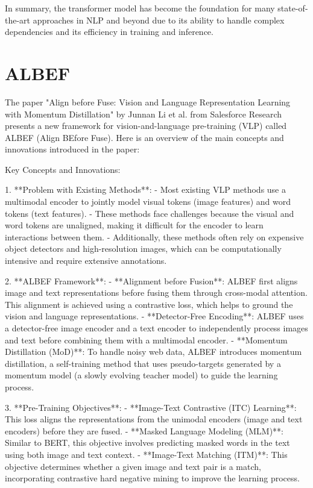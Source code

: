 In summary, the transformer model has become the foundation for many state-of-the-art approaches in NLP and beyond due to its ability to handle complex dependencies and its efficiency in training and inference.

\section{ALBEF}
The paper "Align before Fuse: Vision and Language Representation Learning with Momentum Distillation" by Junnan Li et al. from Salesforce Research presents a new framework for vision-and-language pre-training (VLP) called ALBEF (Align BEfore Fuse). Here is an overview of the main concepts and innovations introduced in the paper:

 Key Concepts and Innovations:

1. **Problem with Existing Methods**:
   - Most existing VLP methods use a multimodal encoder to jointly model visual tokens (image features) and word tokens (text features).
   - These methods face challenges because the visual and word tokens are unaligned, making it difficult for the encoder to learn interactions between them.
   - Additionally, these methods often rely on expensive object detectors and high-resolution images, which can be computationally intensive and require extensive annotations.

2. **ALBEF Framework**:
   - **Alignment before Fusion**: ALBEF first aligns image and text representations before fusing them through cross-modal attention. This alignment is achieved using a contrastive loss, which helps to ground the vision and language representations.
   - **Detector-Free Encoding**: ALBEF uses a detector-free image encoder and a text encoder to independently process images and text before combining them with a multimodal encoder.
   - **Momentum Distillation (MoD)**: To handle noisy web data, ALBEF introduces momentum distillation, a self-training method that uses pseudo-targets generated by a momentum model (a slowly evolving teacher model) to guide the learning process.

3. **Pre-Training Objectives**:
   - **Image-Text Contrastive (ITC) Learning**: This loss aligns the representations from the unimodal encoders (image and text encoders) before they are fused.
   - **Masked Language Modeling (MLM)**: Similar to BERT, this objective involves predicting masked words in the text using both image and text context.
   - **Image-Text Matching (ITM)**: This objective determines whether a given image and text pair is a match, incorporating contrastive hard negative mining to improve the learning process.

